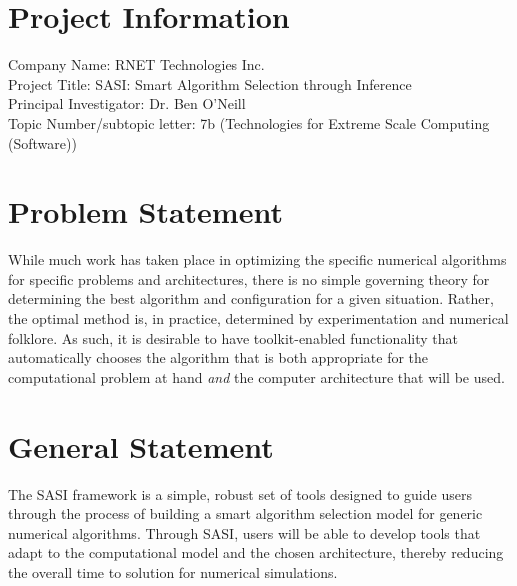\section*{Project Information}
Company Name: RNET Technologies Inc.\\
Project Title: SASI: Smart Algorithm Selection through Inference\\
Principal Investigator: Dr. Ben O'Neill \\
Topic Number/subtopic letter: 7b (Technologies for Extreme Scale Computing (Software))

\section*{Problem Statement}
While much work has taken place in optimizing the specific numerical algorithms for specific problems and architectures, there is no simple governing theory for determining the best algorithm and configuration for a given situation. Rather, the optimal method is, in practice, determined by experimentation and numerical folklore.  As such, it is desirable to have toolkit-enabled functionality that automatically chooses the algorithm that is both appropriate for the computational problem at hand \emph{and} the computer architecture that will be used. 

\section*{General Statement}
The SASI framework is a simple, robust set of tools designed to guide users through the process of building a smart algorithm
selection model for generic numerical algorithms. Through SASI, users will be able to develop tools that adapt to the computational model and 
the chosen architecture, thereby reducing the overall time to solution for numerical simulations. 

